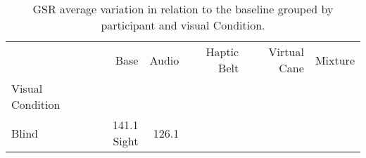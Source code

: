 
\begin{table}[!htb]
\centering
\caption{GSR average variation in relation to the baseline grouped by participant and visual Condition.}
\label{tab:gsr_var_average_group}
\begin{tabular}{lrrrrr}
\toprule
{} &    Base &   Audio & Haptic Belt & Virtual Cane & Mixture \\
Visual Condition &         &         &             &              &         \\
\midrule
Blind            &  141.1%
Sight            &  126.1%
\bottomrule
\end{tabular}
\end{table}


